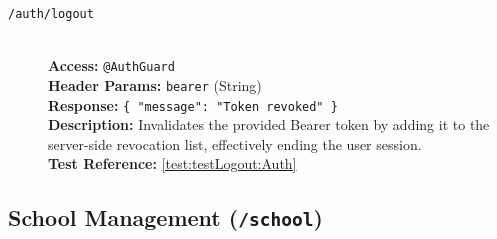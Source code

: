 \begin{description}
	\item[\POST \quad \texttt{/auth/logout}] \hfill \\
	\textbf{Access:} \texttt{@AuthGuard} \\
	\textbf{Header Params:} \texttt{bearer} (String) \\
	\textbf{Response:} \texttt{\{ "message": "Token revoked" \}} \\
	\textbf{Description:} Invalidates the provided Bearer token by adding it to the server-side revocation list, effectively ending the user session.\\
	\textbf{Test Reference:} \ref{test:testLogout:Auth}
	
\end{description}

\subsection{School Management (\texttt{/school})}
